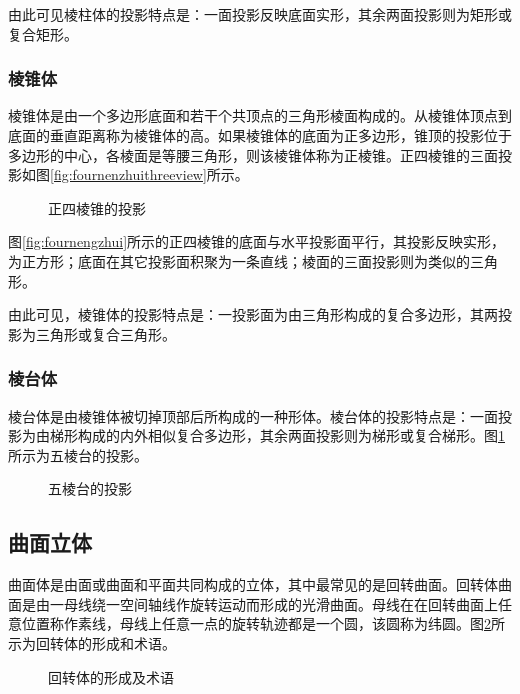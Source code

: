 由此可见棱柱体的投影特点是：一面投影反映底面实形，其余两面投影则为矩形或复合矩形。
\subsubsection{棱锥体}
棱锥体是由一个多边形底面和若干个共顶点的三角形棱面构成的。从棱锥体顶点到底面的垂直距离称为棱锥体的高。如果棱锥体的底面为正多边形，锥顶的投影位于多边形的中心，各棱面是等腰三角形，则该棱锥体称为正棱锥。正四棱锥的三面投影如图\ref{fig:fournenzhuithreeview}所示。

\begin{figure}[htbp]
\centering
{}\hspace{30pt}
\caption{正四棱锥的投影}
\end{figure}

图\ref{fig:fournengzhui}所示的正四棱锥的底面与水平投影面平行，其投影反映实形，为正方形；底面在其它投影面积聚为一条直线；棱面的三面投影则为类似的三角形。

由此可见，棱锥体的投影特点是：一投影面为由三角形构成的复合多边形，其两投影为三角形或复合三角形。
\subsubsection{棱台体}
棱台体是由棱锥体被切掉顶部后所构成的一种形体。棱台体的投影特点是：一面投影为由梯形构成的内外相似复合多边形，其余两面投影则为梯形或复合梯形。图\ref{fig:fivenentai} 所示为五棱台的投影。
\begin{figure}[htbp]
\centering
{}\hspace{30pt}
\caption{五棱台的投影}\label{fig:fivenentai}
\end{figure}

\subsection{曲面立体}
曲面体是由面或曲面和平面共同构成的立体，其中最常见的是回转曲面。回转体曲面是由一母线绕一空间轴线作旋转运动而形成的光滑曲面。母线在在回转曲面上任意位置称作素线，母线上任意一点的旋转轨迹都是一个圆，该圆称为纬圆。图\ref{fig:huizhuangti}所示为回转体的形成和术语。
\begin{figure}[htbp]
\centering
{}\hspace{30pt}
\caption{回转体的形成及术语}\label{fig:huizhuangti}
\end{figure}

